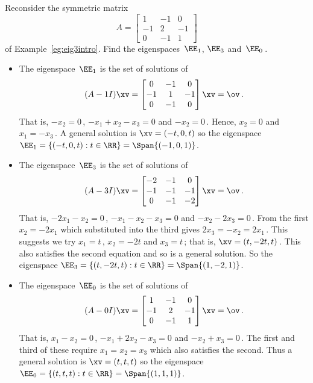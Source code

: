 \begin{example} \label{eg:eig3sp}
Reconsider the symmetric matrix
\begin{equation*}
A=\begin{bmatrix} 1&-1&0\\-1&2&-1\\0&-1&1 \end{bmatrix}
\end{equation*}
of Example~\ref{eg:eig3intro}. 
Find the eigenspaces~\(\EE_1\), \(\EE_3\) and~\(\EE_0\)\,.
\begin{solution} 
\begin{itemize}
\item The eigenspace~\(\EE_1\) is the set of solutions of
\begin{equation*}
(A-1I)\xv=\begin{bmatrix} 0&-1&0\\-1&1&-1\\0&-1&0 \end{bmatrix}
\xv=\ov\,.
\end{equation*}
That is, \(-x_2=0\)\,, \(-x_1+x_2-x_3=0\) and \(-x_2=0\)\,.
Hence, \(x_2=0\) and \(x_1=-x_3\)\,.
A general solution is \(\xv=(-t,0,t)\) so the eigenspace \(\EE_1=\{(-t,0,t) : t\in\RR\}=\Span\{(-1,0,1)\}\).

\item The eigenspace~\(\EE_3\) is the set of solutions of
\begin{equation*}
(A-3I)\xv=\begin{bmatrix} -2&-1&0\\-1&-1&-1\\0&-1&-2 \end{bmatrix}
\xv=\ov\,.
\end{equation*}
That is, \(-2x_1-x_2=0\)\,, \(-x_1-x_2-x_3=0\) and \(-x_2-2x_3=0\)\,.
From the first \(x_2=-2x_1\) which substituted into the third gives \(2x_3=-x_2=2x_1\)\,.  
This suggests we try \(x_1=t\)\,, \(x_2=-2t\) and \(x_3=t\)\,; that is, \(\xv=(t,-2t,t)\)\,.
This also satisfies the second equation and so is a general solution.
So the eigenspace \(\EE_3=\{(t,-2t,t) : t\in\RR\}=\Span\{(1,-2,1)\}\).

\item The eigenspace~\(\EE_0\) is the set of solutions of
\begin{equation*}
(A-0I)\xv=\begin{bmatrix} 1&-1&0\\-1&2&-1\\0&-1&1 \end{bmatrix}
\xv=\ov\,.
\end{equation*}
That is, \(x_1-x_2=0\)\,, \(-x_1+2x_2-x_3=0\) and \(-x_2+x_3=0\)\,.
The first and third of these require \(x_1=x_2=x_3\) which also satisfies the second.
Thus a general solution is \(\xv=(t,t,t)\) so the eigenspace \(\EE_0=\{(t,t,t) : t\in\RR\}=\Span\{(1,1,1)\}\). 
\end{itemize}
\end{solution}
\end{example}





